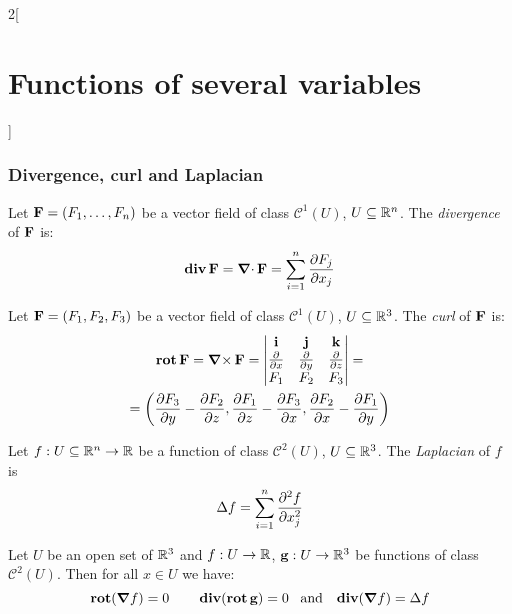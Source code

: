 \documentclass[../../../main_math.tex]{subfiles}
\begin{document}
\begin{multicols}{2}[\section{Functions of several variables}]
  \subsubsection{Divergence, curl and Laplacian}
  \begin{definition}
    Let $\boldsymbol{\mathrm{F}}=(F_1,\ldots, F_n)$ be a vector field of class $\mathcal{C}^1(U)$, $U\subseteq\mathbb{R}^n$. The \emph{divergence} of $\boldsymbol{\mathrm{F}}$ is: $$\operatorname{\boldsymbol{\mathrm{div}}}\boldsymbol{\mathrm{F}}=\operatorname{\boldsymbol{\mathrm{\nabla}}\cdot}\boldsymbol{\mathrm{F}}=\sum_{i=1}^n\frac{\partial F_j}{\partial x_j}$$
  \end{definition}
  \begin{definition}
    Let $\boldsymbol{\mathrm{F}}=(F_1,F_2,F_3)$ be a vector field of class $\mathcal{C}^1(U)$, $U\subseteq\mathbb{R}^3$. The \emph{curl} of $\boldsymbol{\mathrm{F}}$ is:
    \begin{multline*}
      \operatorname{\boldsymbol{\mathrm{rot}}}\boldsymbol{\mathrm{F}}=\operatorname{\boldsymbol{\mathrm{\nabla}}\times}\boldsymbol{\mathrm{F}}=
      \begin{vmatrix}
        \boldsymbol{\mathrm{i}}                      & \boldsymbol{\mathrm{j}}                      & \boldsymbol{\mathrm{k}}                      \\
        \frac{\partial}{\partial x} & \frac{\partial}{\partial y} & \frac{\partial}{\partial z} \\
        F_1                         & F_2                         & F_3                         \\
      \end{vmatrix}=\\=\left(\frac{\partial F_3}{\partial y}-\frac{\partial F_2}{\partial z},\frac{\partial F_1}{\partial z}-\frac{\partial F_3}{\partial x},\frac{\partial F_2}{\partial x}-\frac{\partial F_1}{\partial y}\right)
    \end{multline*}
  \end{definition}
  \begin{definition}\label{FSV_laplacian}
    Let $f:U\subseteq\mathbb{R}^n\rightarrow\mathbb{R} $ be a function of class $\mathcal{C}^2(U)$, $U\subseteq\mathbb{R}^3$. The \emph{Laplacian} of $f$ is $$\Delta f=\sum_{i=1}^n\frac{\partial^2 f}{\partial x_j^2}$$
  \end{definition}
  \begin{proposition}
    Let $U$ be an open set of $\mathbb{R}^3$ and $f:U\rightarrow\mathbb{R} $, $\boldsymbol{\mathrm{g}}:U\rightarrow\mathbb{R}^3$ be functions of class $\mathcal{C}^2(U)$. Then for all $x\in U$ we have: $$\operatorname{\boldsymbol{\mathrm{rot}}}(\grad f)=0\qquad\operatorname{\boldsymbol{\mathrm{div}}}(\operatorname{\boldsymbol{\mathrm{rot}}}\boldsymbol{\mathrm{g}})=0\;\;\;\text{and}\;\;\;\operatorname{\boldsymbol{\mathrm{div}}}(\grad f)=\Delta f$$
  \end{proposition}

\end{multicols}
\end{document}
